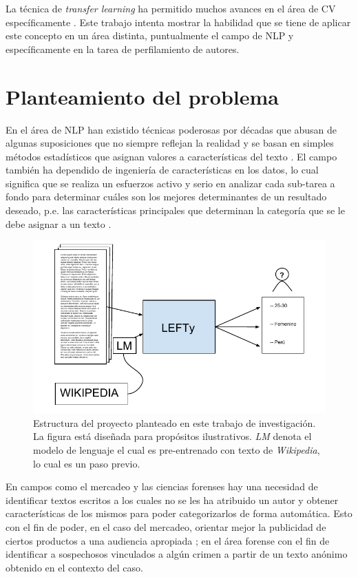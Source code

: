 La técnica de \emph{transfer learning} ha permitido muchos avances en el área de CV específicamente \parencite{hoo2016deep}. Este trabajo intenta mostrar la habilidad que se tiene de aplicar este concepto en un área distinta, puntualmente el campo de NLP y específicamente en la tarea de perfilamiento de autores.

\section{Planteamiento del problema}

En el área de NLP han existido técnicas poderosas por décadas que abusan de algunas suposiciones que no siempre reflejan la realidad y se basan en simples métodos estadísticos que asignan valores a características del texto \parencite{Edmundson1969, kupiec1995trainable}. El campo también ha dependido de ingeniería de características en los datos, lo cual significa que se realiza un esfuerzos activo y serio en analizar cada sub-tarea a fondo para determinar cuáles son los mejores determinantes de un resultado deseado, p.e. las características principales que determinan la categoría que se le debe asignar a un texto \parencite{aggarwal2012mining}.

\begin{figure}
\includegraphics[scale=1.0]{Figures/projectstruct.pdf}
\caption{Estructura del proyecto planteado en este trabajo de investigación. La figura está diseñada para propósitos ilustrativos. \textit{LM} denota el modelo de lenguaje el cual es pre-entrenado con texto de \textit{Wikipedia}, lo cual es un paso previo.}
\label{fig:projstruct}
\end{figure}

En campos como el mercadeo y las ciencias forenses hay una necesidad de identificar textos escritos a los cuales no se les ha atribuido un autor y obtener características de los mismos para poder categorizarlos de forma automática. Esto con el fin de poder, en el caso del mercadeo, orientar mejor la publicidad de ciertos productos a una audiencia apropiada \parencite{aggarwal2012mining}; en el área forense con el fin de identificar a sospechosos vinculados a algún crimen a partir de un texto anónimo obtenido en el contexto del caso.

